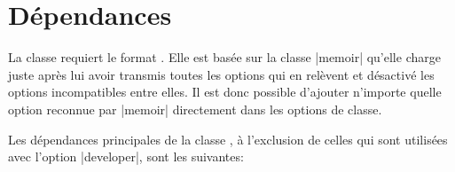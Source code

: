 \begin{noprint}
\end{noprint}




\section{Dépendances}

La classe \frenchlaw requiert le format \LaTeXe. Elle est basée sur la classe |memoir| qu'elle charge juste après lui avoir transmis toutes les options qui en relèvent et désactivé les options incompatibles entre elles. Il est donc possible d'ajouter n'importe quelle option reconnue par |memoir| directement dans les options de classe.

\begin{noprint}
\ProcessOptionsX\relax
\if@marginalia\if@twocolumn\@marginaliafalse\fi\fi
\if@stockavi\if@elevenpoints\@tenpointstrue\@elevenpointsfalse\fi\fi
\if@stockavi\if@twelvepoints\@tenpointstrue\@twelvepointsfalse\fi\fi
\if@stockavi\if@fourteenpoints\@tenpointstrue\@fourteenpointsfalse\fi\fi
\def\baselinestretch{\custom@baselinestretch}\selectfont
\end{noprint}

Les dépendances principales de la classe \frenchlaw, à l'exclusion de celles qui sont utilisées avec l'option |developer|, sont les suivantes:

